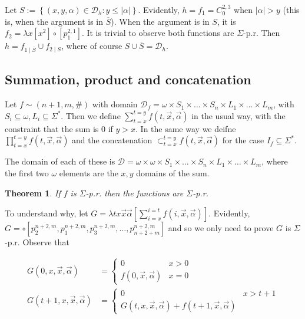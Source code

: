 \documentclass[a4paper, 12pt]{article}
\newtheorem{theorem}{Theorem}
\newtheorem{theorem}{Theorem}
\begin{document}
Let $S := \left\{ (x, y, \alpha) \in \mathcal{D}_h : y \leq |\alpha| \right\}$.
Evidently, $h = f_1 = C_{0}^{2, 3}$ when $|\alpha| > y$ (this is, when the argument is
in $\overline{S}$). When the argument is in $S$, it is $f_2 = \lambda x[x^2] \circ
[p_1^{2, 1}]$. It is trivial to observe both functions are $\Sigma$-p.r. Then $h
= f_{1\mid \overline{S}} \cup f_{2\mid S}$, where of course $S \cup \overline{S}
= \mathcal{D}_h$.

\subsection{Summation, product and concatenation}

Let $f \sim (n + 1, m, \#)$ with domain $\mathcal{D}_f = \omega \times  S_1 \times \ldots
\times  S_n \times L_1 \times \ldots \times   L_m$, with $S_i \subseteq \omega, L_i \subseteq
\Sigma^{*}$. Then we define $\sum_{t =
x}^{t = y} f(t, \overrightarrow{x}, \overrightarrow{\alpha})$ in the usual way,
with the constraint that the sum is $0$ if $y > x$. In the same way we deifne
$\prod_{t = x}^{t = y} f(t, \overrightarrow{x}, \overrightarrow{\alpha})$ and
the concatenation $\mathop{\subset}_{t=x}^{t=y}f(t, \overrightarrow{x},
\overrightarrow{\alpha})$ for the case $I_f \subseteq \Sigma^{*}$.

The domain of each of these is $\mathcal{D} = \omega \times  \omega \times S_1
\times\ldots \times S_n \times L_1 \times  \ldots \times L_m$, where the first
two $\omega$ elements are the $x, y$ domains of the sum.

\begin{theorem}
    If $f$ is $\Sigma$-p.r. then the functions are $\Sigma$-p.r.
\end{theorem}

To understand why, let $G = \lambda tx \overrightarrow{x}\overrightarrow{\alpha}
\left[\sum_{i=x}^{i=t} f(i, \overrightarrow{x},
\overrightarrow{\alpha})\right]$. Evidently, $G = \circ \left[ p_2^{n+2, m},
p_1^{n + 2, m}, p_3^{n+2, m}, \ldots, p_{n+2+m}^{n+2, m} \right] $ and so we
only need to prove $G$ is $\Sigma$-p.r. Observe that 

\begin{align*}
    G(0, x, \overrightarrow{x}, \overrightarrow{\alpha}) &= \begin{cases}
        0 & x > 0 \\ 
        f(0, \overrightarrow{x}, \overrightarrow{\alpha}) & x = 0
    \end{cases} \\ 
    G(t + 1, x, \overrightarrow{x}, \overrightarrow{\alpha}) &= \begin{cases}
        0 & x > t  +1 \\ 
        G(t, x, \overrightarrow{x}, \overrightarrow{\alpha}) + f(t+1,
        \overrightarrow{x}, \overrightarrow{\alpha})
    \end{cases}
\end{align*}
\end{document}
